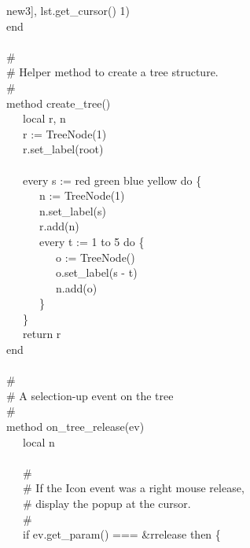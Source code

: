 {{\textquotedbl}new3{\textquotedbl}], lst.get\_cursor() {\textbar} 1) \\
\>   end \\
\ \\
\>   \# \\
\>   \# Helper method to create a tree structure. \\
\>   \# \\
\>   method create\_tree() \\
\>   \ \ \ local r, n \\
\>   \ \ \ r := TreeNode(1) \\
\>   \ \ \ r.set\_label({\textquotedbl}root{\textquotedbl}) \\
\ \\
\>   \ \ \ every s := {\textquotedbl}red{\textquotedbl} {\textbar}
{\textquotedbl}green{\textquotedbl} {\textbar}
{\textquotedbl}blue{\textquotedbl} {\textbar}
{\textquotedbl}yellow{\textquotedbl} do \{ \\
\>   \ \ \ \ \ \ n := TreeNode(1) \\
\>   \ \ \ \ \ \ n.set\_label(s) \\
\>   \ \ \ \ \ \ r.add(n) \\
\>   \ \ \ \ \ \ every t := 1 to 5 do \{ \\
\>   \ \ \ \ \ \ \ \ \ o := TreeNode() \\
\>   \ \ \ \ \ \ \ \ \ o.set\_label(s {\textbar}{\textbar}
{\textquotedbl}-{\textquotedbl} {\textbar}{\textbar}t) \\
\>   \ \ \ \ \ \ \ \ \ n.add(o) \\
\>   \ \ \ \ \ \ \} \\
\>   \ \ \ \} \\
\>   \ \ \ return r \\
\>   end \\
\ \\
\>   \# \\
\>   \# A selection-up event on the tree \\
\>   \# \\
\>   method on\_tree\_release(ev) \\
\>   \ \ \ local n \\
\ \\
\>   \ \ \ \# \\
\>   \ \ \ \# If the Icon event was a right mouse release, \\
\>   \ \ \ \# display the popup at the cursor. \\
\>   \ \ \ \# \\
\>   \ \ \ if ev.get\_param() === \&rrelease then \{ \\
}
